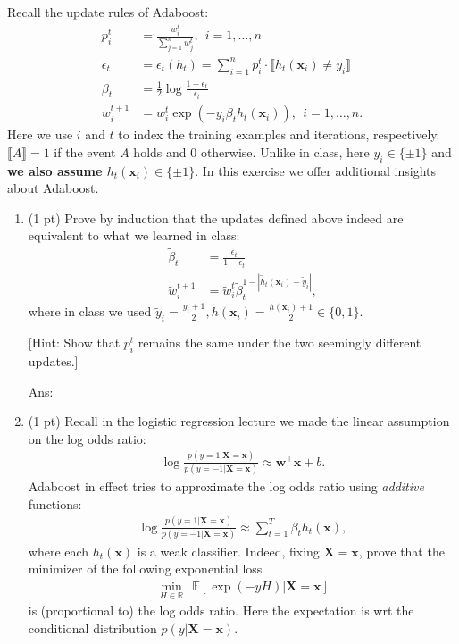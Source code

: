 \documentclass[10pt,letter,notitlepage]{article}
\newcommand{\pred}[1]{\llbracket#1\rrbracket}
\newcommand{\RR}{\mathds{R}}
\newcommand{\wv}{\mathbf{w}}
\newcommand{\xv}{\mathbf{x}}
\newcommand{\red}[1]{{\color{red}#1}}
\newcommand{\Xv}{\mathbf{X}}
\newcommand{\EE}{\mathds{E}}
\newcommand{\ans}[1]{{\color{orange}\textsf{Ans}: #1}}
\newcounter{exercise}
\begin{document}
\begin{exercise}

	Recall the update rules of Adaboost:
	\begin{align}
	p^t_i &= \frac{w^t_i}{\sum_{j=1}^n w^t_j},  ~~ i=1, \ldots, n \\
	\label{eq:eps} \epsilon_t &= \epsilon_t(h_t) = \sum_{i=1}^n p^t_i \cdot \pred{h_t(\xv_i) \ne y_i} \\
	\label{eq:beta}\beta_t &= \frac12\log\frac{1-\epsilon_t}{\epsilon_t} \\
	\label{eq:w} w^{t+1}_i&= w^t_i \exp(- y_i \beta_t h_t(\xv_i) ),  ~~ i=1, \ldots, n.
	\end{align}
	Here we use $i$ and $t$ to index the training examples and iterations, respectively. $\pred{A} = 1$ if the event $A$ holds and 0 otherwise. \red{Unlike in class}, here $y_i \in \{\pm 1\}$ and \textbf{we also assume $h_t(\xv_i) \in \{\pm 1\}$}.
	In this exercise we offer additional insights about Adaboost.

	\begin{enumerate}
		\item (1 pt) Prove by induction that the updates defined above indeed are equivalent to what we learned in class:
		\begin{align}
		\tilde\beta_t &= \frac{\epsilon_t}{1-\epsilon_t} \\
		\tilde w^{t+1}_i & = \tilde w^t_i \tilde\beta_t^{1-|\tilde h_t(\xv_i) - \tilde y_i|},
		\end{align}
		where in class \red{we used $\tilde y_i = \tfrac{y_i+1}{2}, \tilde h(\xv_i) = \tfrac{h(\xv_i)+1}{2} \in \{ 0,1\}$.}

		[Hint: Show that $p_i^t$ remains the same under the two seemingly different updates.]

\ans{} 
		\item (1 pt) Recall in the logistic regression lecture we made the linear assumption on the log odds ratio:
		\begin{align}
		\log\frac{p(y=1 | \Xv = \xv)}{p(y=-1 | \Xv = \xv)} \approx \wv^\top \xv + b.
		\end{align}
		Adaboost in effect tries to approximate the log odds ratio using \emph{additive} functions:
		\begin{align}
		\log\frac{p(y=1 | \Xv = \xv)}{p(y=-1 | \Xv = \xv)} \approx \sum_{t=1}^T \beta_t h_t(\xv),
		\end{align}
		where each $h_t(\xv)$ is a weak classifier. Indeed, fixing $\Xv = \xv$, prove that the minimizer of the following exponential loss
		\begin{align}
		\label{eq:exp}
		\min_{H\in \RR} ~~ \EE[ \exp(- y H) | \Xv = \xv ]
		\end{align}
		is (proportional to) the log odds ratio. Here the expectation is wrt the conditional distribution $p(y | \Xv = \xv)$.


\end{enumerate}
\end{exercise}
\end{document}
